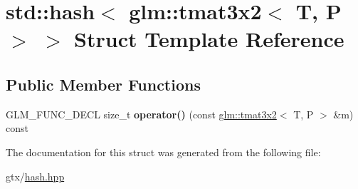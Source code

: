 \hypertarget{structstd_1_1hash_3_01glm_1_1tmat3x2_3_01T_00_01P_01_4_01_4}{\section{std\-:\-:hash$<$ glm\-:\-:tmat3x2$<$ T, P $>$ $>$ Struct Template Reference}
\label{structstd_1_1hash_3_01glm_1_1tmat3x2_3_01T_00_01P_01_4_01_4}
}
\subsection*{Public Member Functions}
\begin{DoxyCompactItemize}
\item 
\hypertarget{structstd_1_1hash_3_01glm_1_1tmat3x2_3_01T_00_01P_01_4_01_4_a2c79ef2caf1dff8cb13670525886fc09}{G\-L\-M\-\_\-\-F\-U\-N\-C\-\_\-\-D\-E\-C\-L size\-\_\-t {\bfseries operator()} (const \hyperlink{structglm_1_1tmat3x2}{glm\-::tmat3x2}$<$ T, P $>$ \&m) const }\label{structstd_1_1hash_3_01glm_1_1tmat3x2_3_01T_00_01P_01_4_01_4_a2c79ef2caf1dff8cb13670525886fc09}

\end{DoxyCompactItemize}


The documentation for this struct was generated from the following file\-:\begin{DoxyCompactItemize}
\item 
gtx/\hyperlink{hash_8hpp}{hash.\-hpp}\end{DoxyCompactItemize}
